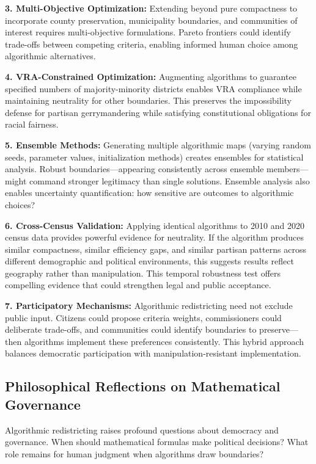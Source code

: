 \textbf{3. Multi-Objective Optimization:} Extending beyond pure compactness to incorporate county preservation, municipality boundaries, and communities of interest requires multi-objective formulations. Pareto frontiers could identify trade-offs between competing criteria, enabling informed human choice among algorithmic alternatives.

\textbf{4. VRA-Constrained Optimization:} Augmenting algorithms to guarantee specified numbers of majority-minority districts enables VRA compliance while maintaining neutrality for other boundaries. This preserves the impossibility defense for partisan gerrymandering while satisfying constitutional obligations for racial fairness.

\textbf{5. Ensemble Methods:} Generating multiple algorithmic maps (varying random seeds, parameter values, initialization methods) creates ensembles for statistical analysis. Robust boundaries—appearing consistently across ensemble members—might command stronger legitimacy than single solutions. Ensemble analysis also enables uncertainty quantification: how sensitive are outcomes to algorithmic choices?

\textbf{6. Cross-Census Validation:} Applying identical algorithms to 2010 and 2020 census data provides powerful evidence for neutrality. If the algorithm produces similar compactness, similar efficiency gaps, and similar partisan patterns across different demographic and political environments, this suggests results reflect geography rather than manipulation. This temporal robustness test offers compelling evidence that could strengthen legal and public acceptance.

\textbf{7. Participatory Mechanisms:} Algorithmic redistricting need not exclude public input. Citizens could propose criteria weights, commissioners could deliberate trade-offs, and communities could identify boundaries to preserve—then algorithms implement these preferences consistently. This hybrid approach balances democratic participation with manipulation-resistant implementation.

\subsection{Philosophical Reflections on Mathematical Governance}

Algorithmic redistricting raises profound questions about democracy and governance. When should mathematical formulas make political decisions? What role remains for human judgment when algorithms draw boundaries?

